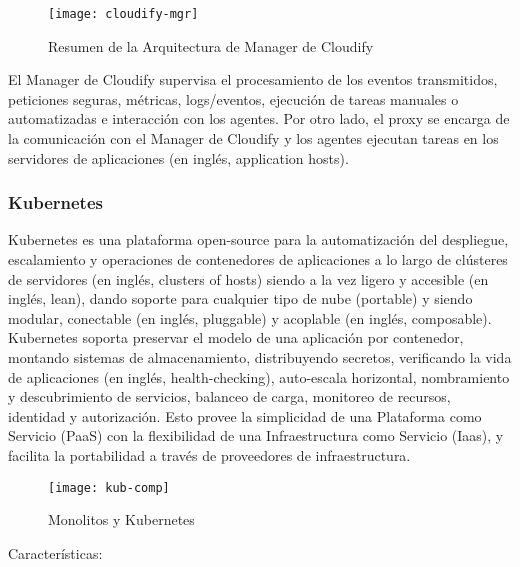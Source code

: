 \begin{figure}[h]
    \centering
    \texttt{[image: cloudify-mgr]}
    \caption{Resumen de la Arquitectura de  Manager de Cloudify \parencite{Cloudify2016-ze}}
    \label{fig:cloudify-mgr}
\end{figure}

El Manager de Cloudify supervisa el procesamiento de los eventos transmitidos, peticiones seguras, métricas, logs/eventos, ejecución de tareas manuales o automatizadas e interacción con los agentes. Por otro lado, el proxy se encarga de la comunicación con el Manager de Cloudify y los agentes ejecutan tareas en los servidores de aplicaciones (en inglés, application hosts).


\subsubsection{Kubernetes}

Kubernetes es una plataforma open-source para la automatización del despliegue, escalamiento y  operaciones de contenedores de aplicaciones a lo largo de clústeres de servidores (en inglés, clusters of hosts) siendo a la vez ligero y accesible (en inglés, lean), dando soporte para cualquier tipo de nube (portable) y siendo modular, conectable (en inglés, pluggable) y acoplable (en inglés, composable).
Kubernetes soporta preservar el modelo de una aplicación por contenedor, montando sistemas de almacenamiento, distribuyendo secretos, verificando la vida de aplicaciones (en inglés, health-checking), auto-escala horizontal, nombramiento y descubrimiento de servicios, balanceo de carga, monitoreo de recursos, identidad y autorización.
Esto provee la simplicidad de una Plataforma como Servicio (PaaS) con la flexibilidad de una Infraestructura como Servicio (Iaas), y facilita la portabilidad a través de proveedores de infraestructura.

\begin{figure}[H]
    \centering
    \texttt{[image: kub-comp]}
    \caption{ Monolitos y Kubernetes \parencite{Kubernetes2016-li}}
    \label{fig:kub-comp}
\end{figure}

Características:
 
